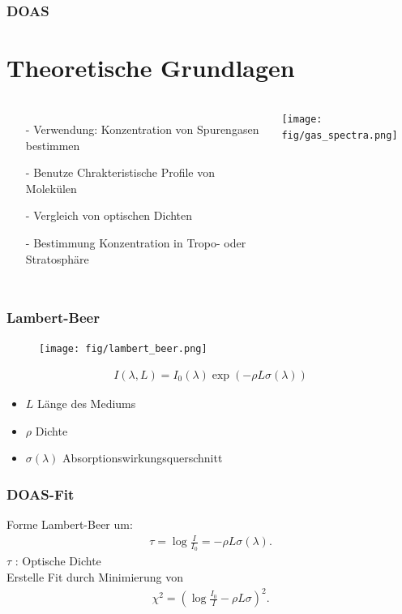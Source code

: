 \documentclass{beamer}
\begin{document}
\begin{frame}
    \frametitle{DOAS}
    \section{Theoretische Grundlagen}
    \begin{columns}
    \begin{itemize}
        \item[-] Verwendung: Konzentration von Spurengasen bestimmen
        \item[-] Benutze Chrakteristische Profile von Molekülen
        \item[-] Vergleich von optischen Dichten
        \item[-] Bestimmung Konzentration in Tropo- oder Stratosphäre
    \end{itemize}
    \begin{minipage}{80mm}
        \texttt{[image: fig/gas\_spectra.png]}
    \end{minipage}
    \end{columns}
\end{frame}

\begin{frame}
    \frametitle{Lambert-Beer}
    \begin{figure}[h]
        \texttt{[image: fig/lambert\_beer.png]}
    \end{figure}
    \begin{align}
    	I(\lambda, L) = I_0 (\lambda) \exp (- \rho  L \sigma (\lambda) )
    \end{align}
    \begin{itemize}
        \item $L$ Länge des Mediums
        \item $\rho$ Dichte
        \item $\sigma (\lambda)$ Absorptionswirkungsquerschnitt %
    \end{itemize}
\end{frame}


\begin{frame}
    \frametitle{DOAS-Fit}
    Forme Lambert-Beer um:
	\begin{align}
    	\tau = \log \frac{I}{I_0} = - \rho L \sigma (\lambda).
	\end{align}
	$\tau$ : Optische Dichte\\
	Erstelle Fit durch Minimierung von
    \begin{align}
        \chi^2 = ( \log \frac{I_0}{I} - \rho L \sigma )^2. 
    \end{align}
\end{frame}
\end{document}
